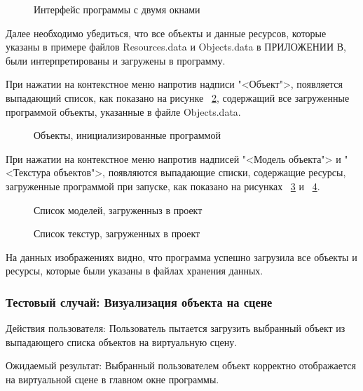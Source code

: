 \begin{figure}[H]
	\caption{Интерфейс программы с двумя окнами}
	\label{screen1:image}
\end{figure}

Далее необходимо убедиться, что все объекты и данные ресурсов, которые указаны в примере файлов Resources.data и Objects.data в ПРИЛОЖЕНИИ В, были интерпретированы и загружены в программу.

При нажатии на контекстное меню напротив надписи "<Объект">, появляется выпадающий список, как показано на рисунке ~\ref{screen2:image}, содержащий все загруженные программой объекты, указанные в файле Objects.data.

\begin{figure}[H]
	\caption{Объекты, инициализированные программой}
	\label{screen2:image}
\end{figure}

При нажатии на контекстное меню напротив надписей "<Модель объекта"> и "<Текстура объектов">, появляются выпадающие списки, содержащие ресурсы, загруженные программой при запуске, как показано на рисунках ~\ref{screen3:image} и ~\ref{screen4:image}.

\begin{figure}[H]
	\caption{Список моделей, загруженныз в проект}
	\label{screen3:image}
\end{figure}

\begin{figure}[H]
	\caption{Список текстур, загруженных в проект}
	\label{screen4:image}
\end{figure}

На данных изображениях видно, что программа успешно загрузила все объекты и ресурсы, которые были указаны в файлах хранения данных.

\subsubsection{Тестовый случай: Визуализация объекта на сцене}
Действия пользователя: Пользователь пытается загрузить выбранный объект из выпадающего списка объектов на виртуальную сцену.

Ожидаемый результат: Выбранный пользователем объект корректно отображается на виртуальной сцене в главном окне программы.

